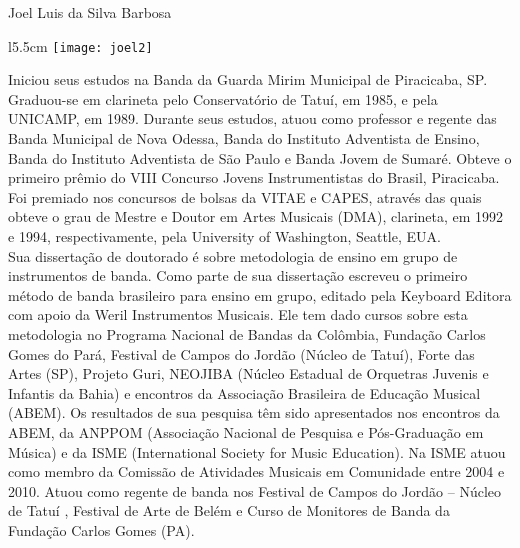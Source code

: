 
\begin{center}
 \Large{Joel Luis da Silva Barbosa}
\end{center}


\begin{wrapfigure}{l}{5.5cm}  %
  \texttt{[image: joel2]}
\end{wrapfigure}

Iniciou seus estudos na Banda da Guarda Mirim Municipal de Piracicaba,
SP. Graduou-se em clarineta pelo Conservatório de Tatuí, em 1985, e
pela UNICAMP, em 1989. Durante seus estudos, atuou como professor e
regente das Banda Municipal de Nova Odessa, Banda do Instituto
Adventista de Ensino, Banda do Instituto Adventista de São Paulo e
Banda Jovem de Sumaré. Obteve o primeiro prêmio do VIII Concurso
Jovens Instrumentistas do Brasil, Piracicaba. Foi premiado nos
concursos de bolsas da VITAE e CAPES, através das quais obteve o grau
de Mestre e Doutor em Artes Musicais (DMA), clarineta, em 1992 e 1994,
respectivamente, pela University of Washington, Seattle, EUA.  \\


Sua dissertação de doutorado é sobre metodologia de ensino em grupo de
instrumentos de banda. Como parte de sua dissertação escreveu o
primeiro método de banda brasileiro para ensino em grupo, editado pela
Keyboard Editora com apoio da Weril Instrumentos Musicais. Ele tem
dado cursos sobre esta metodologia no Programa Nacional de Bandas da
Colômbia, Fundação Carlos Gomes do Pará, Festival de Campos do Jordão
(Núcleo de Tatuí), Forte das Artes (SP), Projeto Guri, NEOJIBA (Núcleo
Estadual de Orquetras Juvenis e Infantis da Bahia) e encontros da
Associação Brasileira de Educação Musical (ABEM). Os resultados de sua
pesquisa têm sido apresentados nos encontros da ABEM, da ANPPOM
(Associação Nacional de Pesquisa e Pós-Graduação em Música) e da ISME
(International Society for Music Education). Na ISME atuou como membro
da Comissão de Atividades Musicais em Comunidade entre 2004 e
2010. Atuou como regente de banda nos Festival de Campos do Jordão –
Núcleo de Tatuí , Festival de Arte de Belém e Curso de Monitores de
Banda da Fundação Carlos Gomes (PA).  \\


